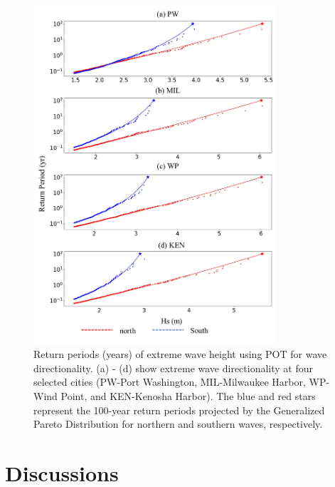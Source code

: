 \begin{figure}[htbp]
  \centering
  \includegraphics[width=0.8\textwidth]{chapter3/resources/figure3-8.jpg}
  \caption{Return periods (years) of extreme wave height using POT for wave directionality. (a) - (d) show extreme wave directionality at four selected cities (PW-Port Washington, MIL-Milwaukee Harbor, WP-Wind Point, and KEN-Kenosha Harbor). The blue and red stars represent the 100-year return periods projected by the Generalized Pareto Distribution for northern and southern waves, respectively.}
  \label{fig:fig3.8}
\end{figure}

\section{Discussions}
\label{c3_Discussions}

